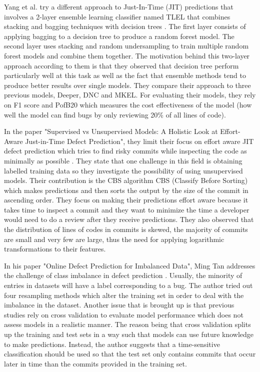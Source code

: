 \documentclass[../main.tex]{subfiles}
\begin{document}
Yang et al. try a different approach to Just-In-Time (JIT) predictions that involves a 2-layer ensemble learning classifier named TLEL that combines stacking and bagging techniques with decision trees \cite{yang2017tlel}. The first layer consists of applying bagging to a decision tree to produce a random forest model. The second layer uses stacking and random undersampling to train multiple random forest models and combine them together. The motivation behind this two-layer approach according to them is that they observed that decision tree perform particularly well at this task as well as the fact that ensemble methods tend to produce better results over single models. They compare their approach to three previous models, Deeper, DNC and MKEL. For evaluating their models, they rely on F1 score and PofB20 which measures the cost effectiveness of the model (how well the model can find bugs by only reviewing 20\% of all lines of code). 

In the paper "Supervised vs Unsupervised Models: A Holistic Look at Effort-Aware Just-in-Time Defect Prediction", they limit their focus on effort aware JIT defect prediction which tries to find risky commits while inspecting the code as minimally as possible \cite{huang2017supervised}. They state that one challenge in this field is obtaining labelled training data so they investigate the possibility of using unsupervised models. Their contribution is the CBS algorithm CBS (Classify Before Sorting) which makes predictions and then sorts the output by the size of the commit in ascending order. They focus on making their predictions effort aware because it takes time to inspect a commit and they want to minimize the time a developer would need to do a review after they receive predictions. They also observed that the distribution of lines of codes in commits is skewed, the majority of commits are small and very few are large, thus the need for applying logarithmic transformations to their features.

In his paper "Online Defect Prediction for Imbalanced Data", Ming Tan addresses the challenge of class imbalance in defect prediction \cite{tan2015online}. Usually, the minority of entries in datasets will have a label corresponding to a bug. The author tried out four resampling methods which alter the training set in order to deal with the imbalance in the dataset. Another issue that is brought up is that previous studies rely on cross validation to evaluate model performance which does not assess models in a realistic manner. The reason being that cross validation splits up the training and test sets in a way such that models can use future knowledge to make predictions. Instead, the author suggests that a time-sensitive classification should be used so that the test set only contains commits that occur later in time than the commits provided in the training set. 
\end{document}
